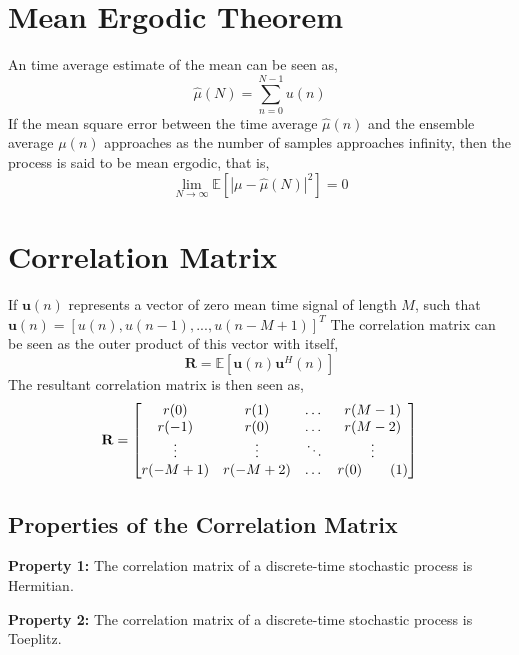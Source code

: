 \documentclass{article}
\newcommand\numberthis{\addtocounter{equation}{1}\tag{\theequation}}
\begin{document}
    \section{Mean Ergodic Theorem}

    An time average estimate of the mean can be seen as,
    \begin{equation}
        \hat{\mu}(N) = \sum_{n=0}^{N-1} u(n)
    \end{equation}
    If the mean square error between the time average \(\hat{\mu}(n)\) and the ensemble average \(\mu(n)\) approaches as
    the number of samples approaches infinity, then the process is said to be mean ergodic, that is,
    \begin{equation}
        \lim_{N\to\infty} \mathbb{E}[|\mu-\hat{\mu}(N)|^2] = 0
    \end{equation}

    \section{Correlation Matrix}
    
    If \(\textbf{u}(n)\) represents a vector of zero mean time signal of length \(M\), such that 
    \(\textbf{u}(n) = [u(n), u(n-1), ..., u(n-M+1)]^T\) 
    The correlation matrix can be seen as the outer product of this vector with itself,
    \begin{equation}
        \textbf{R} = \mathbb{E}[\textbf{u}(n)\textbf{u}^H(n)]
    \end{equation}
    The resultant correlation matrix is then seen as,
    \[
    \textbf{R} = 
    \begin{bmatrix}
        r(0)    & r(1)      & \dots  & r(M-1)   \\
        r(-1)   & r(0)      & \dots  & r(M-2)   \\
        \vdots  & \vdots    & \ddots & \vdots   \\
        r(-M+1) & r(-M+2)   & \dots  & r(0)     \numberthis
    \end{bmatrix}
    \]

    \subsection{Properties of the Correlation Matrix}

    \noindent\textbf{Property 1:} The correlation matrix of a discrete-time stochastic process is Hermitian.
    
    \noindent\textbf{Property 2:} The correlation matrix of a discrete-time stochastic process is Toeplitz.
\end{document}

